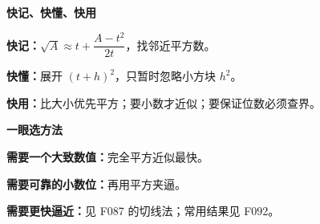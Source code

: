 \clearpage
\begin{summarybox}
\textbf{\textcolor{CSummary}{快记、快懂、快用}}
\par\medskip
\begin{center}

\end{center}
\medskip
\textbf{快记：}$\sqrt A\approx t+\dfrac{A-t^2}{2t}$，找邻近平方数。\par\textbf{快懂：}展开 $(t+h)^2$，只暂时忽略小方块 $h^2$。\par\textbf{快用：}比大小优先平方；要小数才近似；要保证位数必须查界。
\end{summarybox}
\clearpage
\begin{summarybox}
\textbf{\textcolor{CSummary}{一眼选方法}}
\par\medskip
\begin{center}

\end{center}
\medskip
\textbf{需要一个大致数值：}完全平方近似最快。\par\textbf{需要可靠的小数位：}再用平方夹逼。\par\textbf{需要更快逼近：}见 F087 的切线法；常用结果见 F092。
\end{summarybox}
